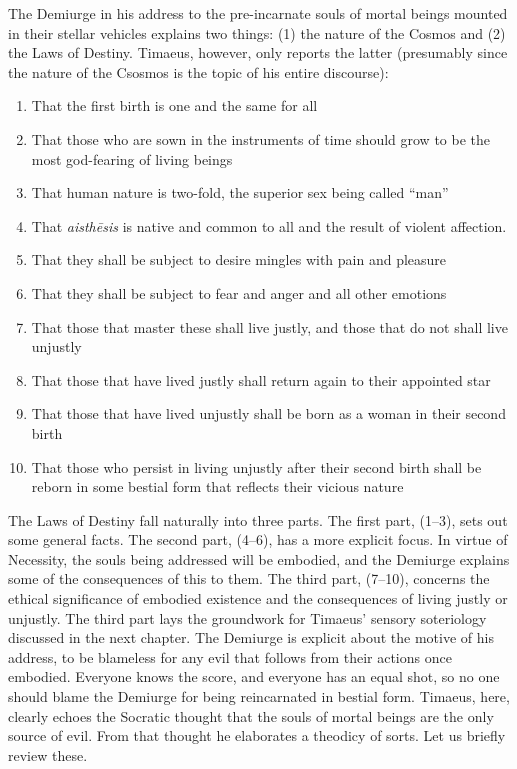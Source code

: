 The Demiurge in his address to the pre-incarnate souls of mortal beings mounted in their stellar vehicles explains two things: (1) the nature of the Cosmos and (2) the Laws of Destiny. Timaeus, however, only reports the latter (presumably since the nature of the Csosmos is the topic of his entire discourse):
\begin{enumerate}
	\item That the first birth is one and the same for all
	\item That those who are sown in the instruments of time should grow to be the most god-fearing of living beings
	\item That human nature is two-fold, the superior sex being called ``man''
	\item That \emph{aisthēsis} is native and common to all and the result of violent affection.
	\item That they shall be subject to desire mingles with pain and pleasure
	\item That they shall be subject to fear and anger and all other emotions
	\item That those that master these shall live justly, and those that do not shall live unjustly
	\item That those that have lived justly shall return again to their appointed star
	\item That those that have lived unjustly shall be born as a woman in their second birth
	\item That those who persist in living unjustly after their second birth shall be reborn in some bestial form that reflects their vicious nature
\end{enumerate}
The Laws of Destiny fall naturally into three parts. The first part, (1--3), sets out some general facts. The second part, (4--6), has a more explicit focus. In virtue of Necessity, the souls being addressed will be embodied, and the Demiurge explains some of the consequences of this to them. The third part, (7--10), concerns the ethical significance of embodied existence and the consequences of living justly or unjustly. The third part lays the groundwork for Timaeus' sensory soteriology discussed in the next chapter. The Demiurge is explicit about the motive of his address, to be blameless for any evil that follows from their actions once embodied. Everyone knows the score, and everyone has an equal shot, so no one should blame the Demiurge for being reincarnated in bestial form. Timaeus, here, clearly echoes the Socratic thought that the souls of mortal beings are the only source of evil. From that thought he elaborates a theodicy of sorts. Let us briefly review these.


